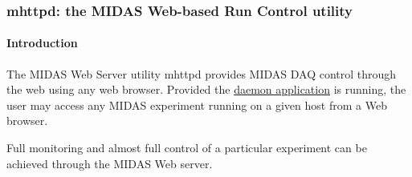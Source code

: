 \par
 

\label{index_end}
\hypertarget{index_end}{}
 \subsubsection{mhttpd: the MIDAS Web-\/based Run Control utility}\label{RC_mhttpd}
\label{RC_mhttpd_utility_idx_mhttpd-utility}
\hypertarget{RC_mhttpd_utility_idx_mhttpd-utility}{}


\par
 

\label{RC_mhttpd_idx_mhttpd}
\hypertarget{RC_mhttpd_idx_mhttpd}{}
 \label{RC_mhttpd_idx_midas_webserver}
\hypertarget{RC_mhttpd_idx_midas_webserver}{}
 \begin{center} \par
\par
\par
  \end{center} \hypertarget{RC_mhttpd_RC_mhttpd_intro}{}\paragraph{Introduction}\label{RC_mhttpd_RC_mhttpd_intro}
The MIDAS Web Server utility mhttpd provides MIDAS DAQ control through the web using any web browser. Provided the \hyperlink{RC_mhttpd_utility}{daemon application} is running, the user may access any MIDAS experiment running on a given host from a Web browser.

Full monitoring and almost full control of a particular experiment can be achieved through the MIDAS Web server.


